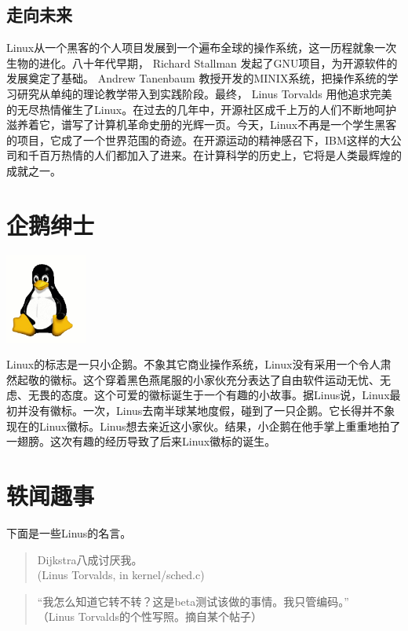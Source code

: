 \documentclass[12pt,a4paper]{article}
\begin{document}
\subsection{走向未来}
\label{sec-4-4}

   Linux从一个黑客的个人项目发展到一个遍布全球的操作系统，这一历程就象一次生物的进化。八十年代早期， Richard Stallman 发起了GNU项目，为开源软件的发展奠定了基础。 Andrew Tanenbaum 教授开发的MINIX系统，把操作系统的学习研究从单纯的理论教学带入到实践阶段。最终， Linus Torvalds 用他追求完美的无尽热情催生了Linux。在过去的几年中，开源社区成千上万的人们不断地呵护滋养着它，谱写了计算机革命史册的光辉一页。今天，Linux不再是一个学生黑客的项目，它成了一个世界范围的奇迹。在开源运动的精神感召下，IBM这样的大公司和千百万热情的人们都加入了进来。在计算科学的历史上，它将是人类最辉煌的成就之一。
\section{企鹅绅士}
\label{sec-5}

  \includegraphics[width=0.2\textwidth]{./figs/logo.png}
  
  Linux的标志是一只小企鹅。不象其它商业操作系统，Linux没有采用一个令人肃然起敬的徽标。这个穿着黑色燕尾服的小家伙充分表达了自由软件运动无忧、无虑、无畏的态度。这个可爱的徽标诞生于一个有趣的小故事。据Linus说，Linux最初并没有徽标。一次，Linus去南半球某地度假，碰到了一只企鹅。它长得并不象现在的Linux徽标。Linus想去亲近这小家伙。结果，小企鹅在他手掌上重重地拍了一翅膀。这次有趣的经历导致了后来Linux徽标的诞生。
\section{轶闻趣事}
\label{sec-6}

下面是一些Linus的名言。
\begin{verse}
Dijkstra八成讨厌我。\\
(Linus Torvalds, in kernel/sched.c)\\
\end{verse}

\begin{verse}
“我怎么知道它转不转？这是beta测试该做的事情。我只管编码。”\\
（Linus Torvalds的个性写照。摘自某个帖子）\\
\end{verse}
\end{document}
